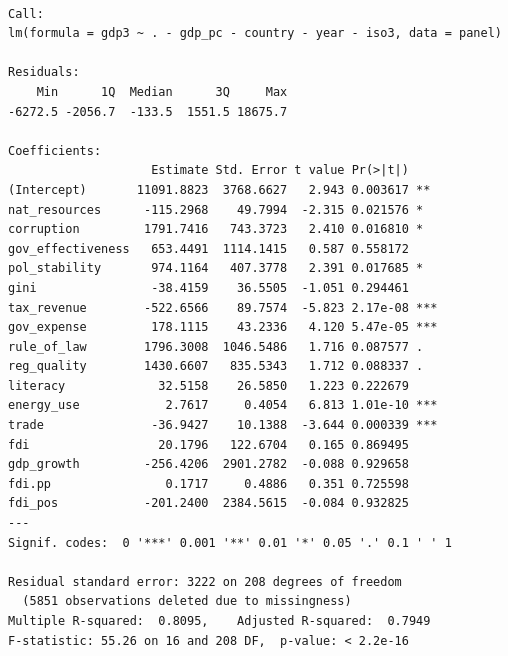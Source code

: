 \documentclass[
  letterpaper,
  DIV=11,
  numbers=noendperiod]{scrartcl}
\begin{document}
\begin{verbatim}

Call:
lm(formula = gdp3 ~ . - gdp_pc - country - year - iso3, data = panel)

Residuals:
    Min      1Q  Median      3Q     Max 
-6272.5 -2056.7  -133.5  1551.5 18675.7 

Coefficients:
                    Estimate Std. Error t value Pr(>|t|)    
(Intercept)       11091.8823  3768.6627   2.943 0.003617 ** 
nat_resources      -115.2968    49.7994  -2.315 0.021576 *  
corruption         1791.7416   743.3723   2.410 0.016810 *  
gov_effectiveness   653.4491  1114.1415   0.587 0.558172    
pol_stability       974.1164   407.3778   2.391 0.017685 *  
gini                -38.4159    36.5505  -1.051 0.294461    
tax_revenue        -522.6566    89.7574  -5.823 2.17e-08 ***
gov_expense         178.1115    43.2336   4.120 5.47e-05 ***
rule_of_law        1796.3008  1046.5486   1.716 0.087577 .  
reg_quality        1430.6607   835.5343   1.712 0.088337 .  
literacy             32.5158    26.5850   1.223 0.222679    
energy_use            2.7617     0.4054   6.813 1.01e-10 ***
trade               -36.9427    10.1388  -3.644 0.000339 ***
fdi                  20.1796   122.6704   0.165 0.869495    
gdp_growth         -256.4206  2901.2782  -0.088 0.929658    
fdi.pp                0.1717     0.4886   0.351 0.725598    
fdi_pos            -201.2400  2384.5615  -0.084 0.932825    
---
Signif. codes:  0 '***' 0.001 '**' 0.01 '*' 0.05 '.' 0.1 ' ' 1

Residual standard error: 3222 on 208 degrees of freedom
  (5851 observations deleted due to missingness)
Multiple R-squared:  0.8095,    Adjusted R-squared:  0.7949 
F-statistic: 55.26 on 16 and 208 DF,  p-value: < 2.2e-16
\end{verbatim}
\end{document}
